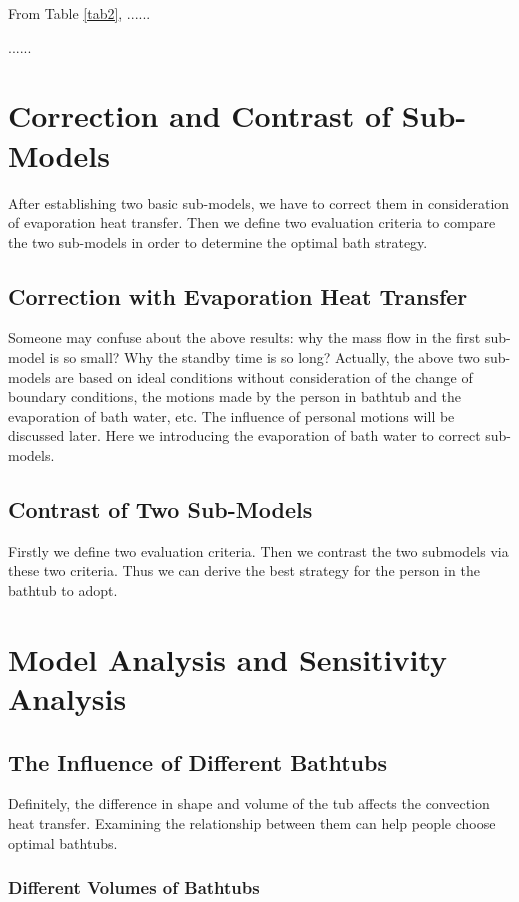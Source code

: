 \documentclass{mcmthesis}
\begin{document}
From Table \ref{tab2}, ......

......

\section{Correction and Contrast of Sub-Models}

After establishing two basic sub-models, we have to correct them in consideration of evaporation heat transfer. Then we define two evaluation criteria to compare the two sub-models in order to determine the optimal bath strategy.

\subsection{Correction with Evaporation Heat Transfer}

Someone may confuse about the above results: why the mass flow in the first sub-model is so small? Why the standby time is so long? Actually, the above two sub-models are based on ideal conditions without consideration of the change of boundary conditions, the motions made by the person in bathtub and the evaporation of bath water, etc. The influence of personal motions will be discussed later. Here we introducing the evaporation of bath water to correct sub-models.

\subsection{Contrast of Two Sub-Models}

Firstly we define two evaluation criteria. Then we contrast the two submodels via these two criteria. Thus we can derive the best strategy for the person in the bathtub to adopt.

\section{Model Analysis and Sensitivity Analysis}

\subsection{The Influence of Different Bathtubs}

Definitely, the difference in shape and volume of the tub affects the
convection heat transfer. Examining the relationship between them can help
people choose optimal bathtubs.

\subsubsection{Different Volumes of Bathtubs}
\end{document}
